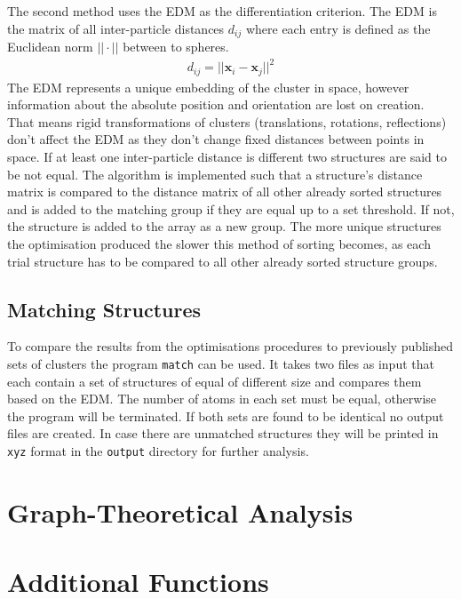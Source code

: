 The second method uses the \ac{EDM} as the differentiation criterion. The
\ac{EDM} is the matrix of all inter-particle distances $d_{ij}$ where each
entry is defined as the Euclidean norm $||\cdot||$ between to spheres.
%
\begin{align}
    d_{ij}=||\mathbf{x}_i-\mathbf{x}_j||^2
\end{align}
%
The \ac{EDM} represents a unique embedding of the cluster in space, however
information about the absolute position and orientation are lost on creation.
That means rigid transformations of clusters (translations, rotations,
reflections) don't affect the \ac{EDM} as they don't change fixed distances
between points in space.\autocite{Dokmanic_EuclideanDistanceMatrices_2015} If
at least one inter-particle distance is different two structures are said to be
not equal. The algorithm is implemented such that a structure's distance matrix
is compared to the distance matrix of all other already sorted structures and
is added to the matching group if they are equal up to a set threshold. If not,
the structure is added to the array as a new group. The more unique structures
the optimisation produced the slower this method of sorting becomes, as each
trial structure has to be compared to all other already sorted structure
groups.

\subsection{Matching Structures}
\label{sec:matchingstructures}

To compare the results from the optimisations procedures to previously
published sets of clusters the program \verb|match| can be used. It takes two
files as input that each contain a set of structures of equal of different size
and compares them based on the \ac{EDM}. The number of atoms in each set must
be equal, otherwise the program will be terminated. If both sets are found to
be identical no output files are created. In case there are unmatched
structures they will be printed in \verb|xyz| format in the \verb|output|
directory for further analysis.

\section{Graph-Theoretical Analysis}
\label{sec:GraphTheoreticalAnalysis}



\section{Additional Functions}
\label{sec:AdditionalFunctions}

